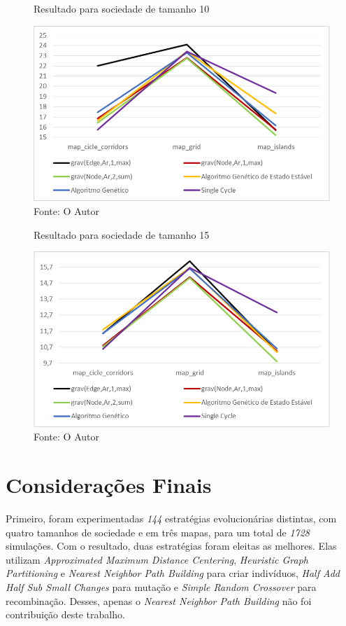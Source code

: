 \begin{figure}
	\caption[Resultado para sociedade de tamanho 10]{Resultado para sociedade 
		de tamanho 10}
	\centering
	\includegraphics[width=\columnwidth]{images/graph_agent3.png}
	\caption*{Fonte: O Autor}
	\label{fig:graph_agentes3}
\end{figure}

\begin{figure}
	\caption[Resultado para sociedade de tamanho 15]{Resultado para sociedade 
		de tamanho 15}
	\centering
	\includegraphics[width=\columnwidth]{images/graph_agent4.png}
	\caption*{Fonte: O Autor}
	\label{fig:graph_agentes4}
\end{figure}

\section{Considerações Finais}

Primeiro, foram experimentadas \textit{144} estratégias evolucionárias 
distintas, com quatro tamanhos de sociedade e em três mapas, para um total de 
\textit{1728} simulações. Com o resultado, duas estratégias foram eleitas as 
melhores. Elas utilizam \textit{Approximated Maximum Distance Centering}, 
\textit{Heuristic Graph Partitioning} e \textit{Nearest Neighbor Path Building} 
para criar indivíduos, \textit{Half Add Half Sub Small Changes} para mutação e 
\textit{Simple Random Crossover} para recombinação. Desses, apenas o 
\textit{Nearest Neighbor Path Building} não foi contribuição deste trabalho.

